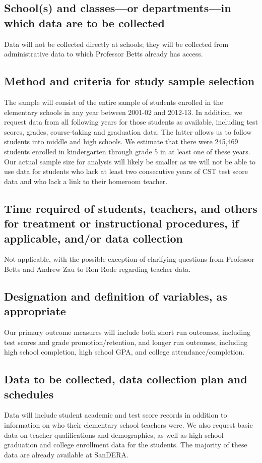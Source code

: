 \documentclass[letterpaper,12pt]{article}
\begin{document}
\subsection{School(s) and classes—or departments—in which data are to be collected}
Data will not be collected directly at schools; they will be collected from administrative data to which Professor Betts already has access.



\subsection{Method and criteria for study sample selection}
The sample will consist of the entire sample of students enrolled in the elementary schools in any year between 2001-02 and 2012-13. In addition, we request data from all following years for those students as available, including test scores, grades, course-taking and graduation data. The latter allows us to follow students into middle and high schools. We estimate that there were 245,469 students enrolled in kindergarten through grade 5 in at least one of these years. Our actual sample size for analysis will likely be smaller as we will not be able to use data for students who lack at least two consecutive years of CST test score data and who lack a link to their homeroom teacher. 



\subsection{Time required of students, teachers, and others for treatment or instructional procedures, if applicable, and/or data collection}
Not applicable, with the possible exception of clarifying questions from Professor Betts and Andrew Zau to Ron Rode regarding teacher data.



\subsection{Designation and definition of variables, as appropriate}
Our primary outcome measures will include both short run outcomes, including test scores and grade promotion/retention, and longer run outcomes, including high school completion, high school GPA, and college attendance/completion.



\subsection{Data to be collected, data collection plan and schedules}
Data will include student academic and test score records in addition to information on who their elementary school teachers were. We also request basic data on teacher qualifications and demographics, as well as high school graduation and college enrollment data for the students. The majority of these data are already available at SanDERA.
\end{document}
